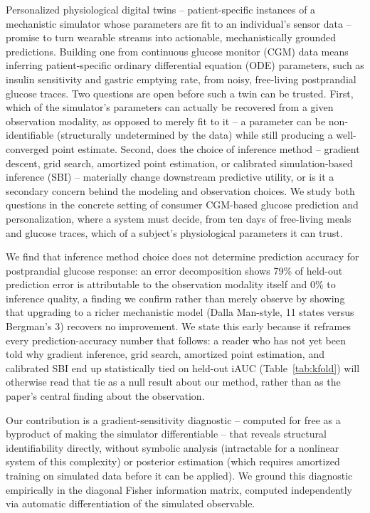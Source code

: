 \documentclass[letterpaper]{article} %
\begin{document}
Personalized physiological digital twins -- patient-specific instances of a mechanistic simulator
whose parameters are fit to an individual's sensor data -- promise to turn wearable streams into
actionable, mechanistically grounded predictions. Building one from continuous glucose monitor
(CGM) data means inferring patient-specific ordinary differential equation (ODE) parameters, such
as insulin sensitivity and gastric emptying rate, from noisy, free-living postprandial glucose
traces. Two questions are open before such a twin can be trusted. First, which of the simulator's
parameters can actually be recovered from a given observation modality, as opposed to merely fit
to it -- a parameter can be non-identifiable (structurally undetermined by the data) while still
producing a well-converged point estimate. Second, does the choice of inference method -- gradient
descent, grid search, amortized point estimation, or calibrated simulation-based inference (SBI) --
materially change downstream predictive utility, or is it a secondary concern behind the modeling
and observation choices. We study both questions in the concrete setting of consumer CGM-based
glucose prediction and personalization, where a system must decide, from ten days of free-living
meals and glucose traces, which of a subject's physiological parameters it can trust.

We find that inference method choice does not determine prediction accuracy for postprandial
glucose response: an error decomposition shows 79\% of held-out prediction error is attributable
to the observation modality itself and 0\% to inference quality, a finding we confirm rather than
merely observe by showing that upgrading to a richer mechanistic model (Dalla Man-style, 11 states
versus Bergman's 3) recovers no improvement. We state this early because it reframes every
prediction-accuracy number that follows: a reader who has not yet been told why gradient inference,
grid search, amortized point estimation, and calibrated SBI end up statistically tied on held-out
iAUC (Table~\ref{tab:kfold}) will otherwise read that tie as a null result about our method, rather
than as the paper's central finding about the observation.

Our contribution is a gradient-sensitivity diagnostic -- computed for free as a byproduct of making
the simulator differentiable -- that reveals structural identifiability directly, without symbolic
analysis (intractable for a nonlinear system of this complexity) or posterior estimation (which
requires amortized training on simulated data before it can be applied). We ground this
diagnostic empirically in the diagonal Fisher information matrix, computed independently via
automatic differentiation of the simulated observable.
\end{document}
